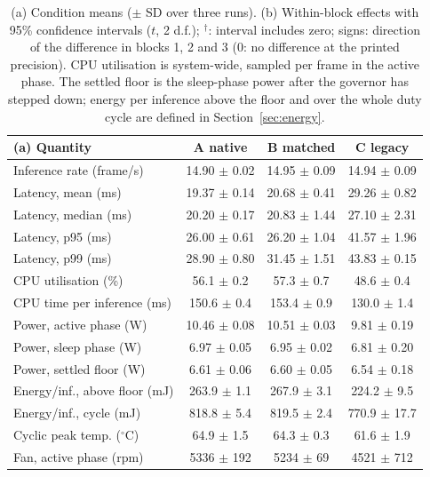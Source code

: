\begin{table}[!t]
\centering
\caption{(a) Condition means ($\pm$ SD over three runs). (b) Within-block effects with 95\% confidence intervals ($t$, 2 d.f.); $^{\dagger}$: interval includes zero; signs: direction of the difference in blocks 1, 2 and 3 (0: no difference at the printed precision). CPU utilisation is system-wide, sampled per frame in the active phase. The settled floor is the sleep-phase power after the governor has stepped down; energy per inference above the floor and over the whole duty cycle are defined in Section~\ref{sec:energy}.}
\label{tab:results}
\setlength{\tabcolsep}{3.2pt}
\footnotesize
\begin{tabular}{lccc}
\toprule
(a) Quantity & A native & B matched & C legacy\\
\midrule
Inference rate (frame/s) & 14.90 $\pm$ 0.02 & 14.95 $\pm$ 0.09 & 14.94 $\pm$ 0.09\\
Latency, mean (ms) & 19.37 $\pm$ 0.14 & 20.68 $\pm$ 0.41 & 29.26 $\pm$ 0.82\\
Latency, median (ms) & 20.20 $\pm$ 0.17 & 20.83 $\pm$ 1.44 & 27.10 $\pm$ 2.31\\
Latency, p95 (ms) & 26.00 $\pm$ 0.61 & 26.20 $\pm$ 1.04 & 41.57 $\pm$ 1.96\\
Latency, p99 (ms) & 28.90 $\pm$ 0.80 & 31.45 $\pm$ 1.51 & 43.83 $\pm$ 0.15\\
CPU utilisation (\%) & 56.1 $\pm$ 0.2 & 57.3 $\pm$ 0.7 & 48.6 $\pm$ 0.4\\
CPU time per inference (ms) & 150.6 $\pm$ 0.4 & 153.4 $\pm$ 0.9 & 130.0 $\pm$ 1.4\\
Power, active phase (W) & 10.46 $\pm$ 0.08 & 10.51 $\pm$ 0.03 & 9.81 $\pm$ 0.19\\
Power, sleep phase (W) & 6.97 $\pm$ 0.05 & 6.95 $\pm$ 0.02 & 6.81 $\pm$ 0.20\\
Power, settled floor (W) & 6.61 $\pm$ 0.06 & 6.60 $\pm$ 0.05 & 6.54 $\pm$ 0.18\\
Energy/inf., above floor (mJ) & 263.9 $\pm$ 1.1 & 267.9 $\pm$ 3.1 & 224.2 $\pm$ 9.5\\
Energy/inf., cycle (mJ) & 818.8 $\pm$ 5.4 & 819.5 $\pm$ 2.4 & 770.9 $\pm$ 17.7\\
Cyclic peak temp. ($^\circ$C) & 64.9 $\pm$ 1.5 & 64.3 $\pm$ 0.3 & 61.6 $\pm$ 1.9\\
Fan, active phase (rpm) & 5336 $\pm$ 192 & 5234 $\pm$ 69 & 4521 $\pm$ 712\\
\bottomrule
\end{tabular}


\end{table}
